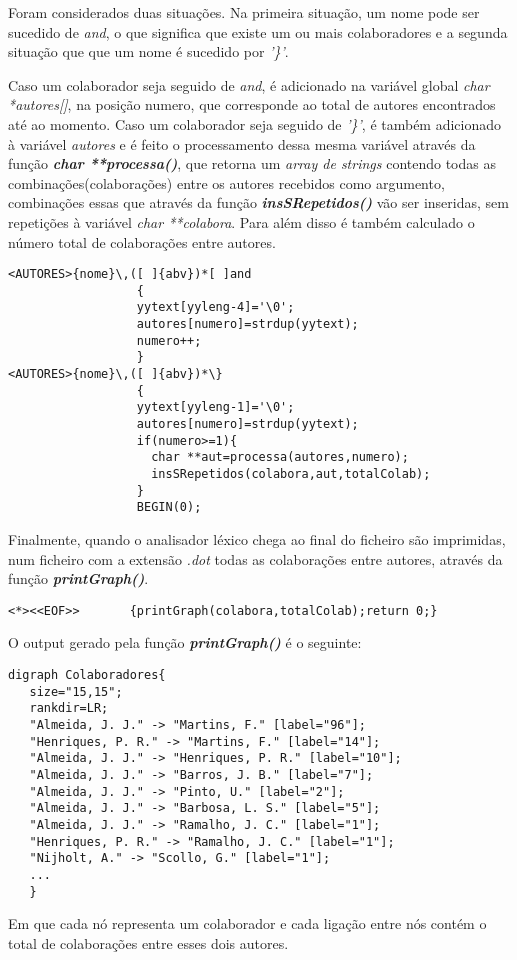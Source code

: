 Foram considerados duas situações. Na primeira situação, um nome pode ser sucedido de \emph{and}, o que significa que existe um ou mais colaboradores e a segunda situação que que um nome é sucedido por \emph{'\}'}.

Caso um colaborador seja seguido de \emph{and}, é adicionado na variável global \emph{char *autores[]}, na posição numero, que corresponde ao total de autores encontrados até ao momento. Caso um colaborador seja seguido de \emph{'\}'}, é também adicionado à variável \emph{autores} e é feito o processamento dessa mesma variável através da função \textbf{\emph{char **processa()}}, que retorna um \emph{array de strings} contendo todas as combinações(colaborações) entre os autores recebidos como argumento, combinações essas que através da função \textbf{\emph{insSRepetidos()}} vão ser inseridas, sem repetições à variável \emph{char **colabora}. Para além disso é também calculado o número total de colaborações entre autores.
\begin{verbatim}
<AUTORES>{nome}\,([ ]{abv})*[ ]and  
                  {
                  yytext[yyleng-4]='\0';
                  autores[numero]=strdup(yytext);
                  numero++;
                  }
<AUTORES>{nome}\,([ ]{abv})*\}      
                  {
                  yytext[yyleng-1]='\0';
                  autores[numero]=strdup(yytext);
                  if(numero>=1){
                  	char **aut=processa(autores,numero);
                    insSRepetidos(colabora,aut,totalColab);
                  }
                  BEGIN(0);
\end{verbatim}

Finalmente, quando o analisador léxico chega ao final do ficheiro são imprimidas, num ficheiro com a extensão \emph{.dot} todas as colaborações entre autores, através da função \textbf{\emph{printGraph()}}.
\begin{verbatim}
<*><<EOF>>       {printGraph(colabora,totalColab);return 0;}
\end{verbatim}

O output gerado pela função \textbf{\emph{printGraph()}} é o seguinte:
\begin{verbatim}
digraph Colaboradores{
   size="15,15";
   rankdir=LR;
   "Almeida, J. J." -> "Martins, F." [label="96"];
   "Henriques, P. R." -> "Martins, F." [label="14"];
   "Almeida, J. J." -> "Henriques, P. R." [label="10"];
   "Almeida, J. J." -> "Barros, J. B." [label="7"];
   "Almeida, J. J." -> "Pinto, U." [label="2"];
   "Almeida, J. J." -> "Barbosa, L. S." [label="5"];
   "Almeida, J. J." -> "Ramalho, J. C." [label="1"];
   "Henriques, P. R." -> "Ramalho, J. C." [label="1"];
   "Nijholt, A." -> "Scollo, G." [label="1"];
   ...
   }
\end{verbatim}

Em que cada nó representa um colaborador e cada ligação entre nós contém o total de colaborações entre esses dois autores.
